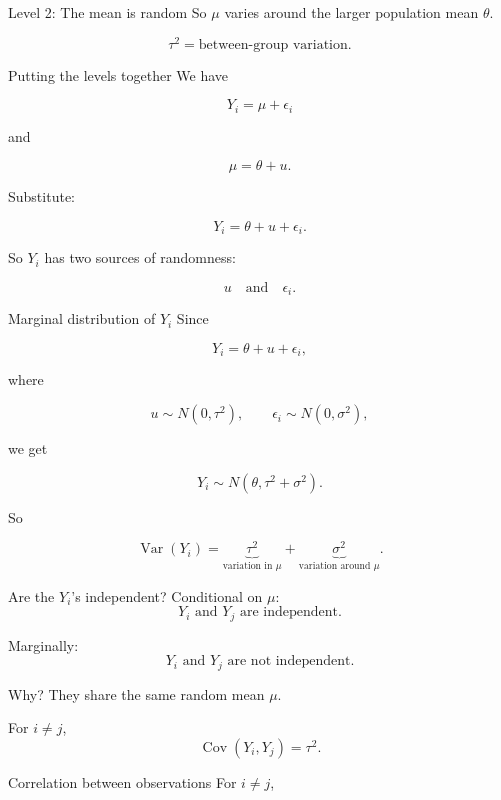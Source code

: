 \documentclass[aspectratio=43,11pt]{beamer}
\begin{document}
{\begin{frame}{Level 2: The mean is random}
\medskip
So \(\mu\) varies around the larger population mean \(\theta\).

\[
\tau^2
=
\text{between-group variation.}
\]
\end{frame}

\begin{frame}{Putting the levels together}
We have

\[
Y_i = \mu + \epsilon_i
\]

and

\[
\mu = \theta + u.
\]

Substitute:

\[
Y_i = \theta + u + \epsilon_i.
\]

\medskip
So \(Y_i\) has two sources of randomness:

\[
u
\quad \text{and} \quad
\epsilon_i.
\]
\end{frame}

\begin{frame}{Marginal distribution of \(Y_i\)}
Since

\[
Y_i = \theta + u + \epsilon_i,
\]

where

\[
u \sim N(0,\tau^2),
\qquad
\epsilon_i \sim N(0,\sigma^2),
\]

we get

\[
Y_i \sim N(\theta,\tau^2+\sigma^2).
\]

\medskip
So

\[
\operatorname{Var}(Y_i)
=
\underbrace{\tau^2}_{\text{variation in } \mu}
+
\underbrace{\sigma^2}_{\text{variation around } \mu}.
\]
\end{frame}

\begin{frame}{Are the \(Y_i\)'s independent?}
Conditional on \(\mu\):
\[
Y_i \text{ and } Y_j \text{ are independent.}
\]

\medskip
Marginally:
\[
Y_i \text{ and } Y_j \text{ are not independent.}
\]

\medskip
Why? They share the same random mean \(\mu\).

\medskip
For \(i \neq j\),
\[
\operatorname{Cov}(Y_i,Y_j)=\tau^2.
\]
\end{frame}

\begin{frame}{Correlation between observations}
For \(i \neq j\),


\end{frame}}
\end{document}

